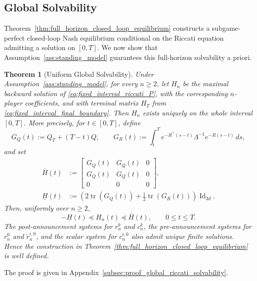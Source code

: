 \documentclass[12pt]{article}
\numberwithin{equation}{section}
\newtheorem{theorem}{Theorem}[section]
\theoremstyle{definition}
\begin{document}
\subsection{Global Solvability}\label{sec:solvability_structure}

Theorem~\ref{thm:full_horizon_closed_loop_equilibrium} constructs a
subgame-perfect closed-loop Nash equilibrium conditional on the Riccati
equation admitting a solution on \([0,T]\). We now show that
Assumption~\ref{ass:standing_model} guarantees this full-horizon solvability a
priori.

\begin{theorem}[Uniform Global Solvability]
\label{thm:global_riccati_solvability}
Under Assumption~\ref{ass:standing_model}, for every \(n\ge2\), let
\(H_n\) be the maximal backward solution of
\eqref{eq:fixed_interval_riccati_P}, with the corresponding
\(n\)-player coefficients, and with terminal matrix \(H_T\) from
\eqref{eq:fixed_interval_final_boundary}.
Then \(H_n\) exists uniquely on the whole interval \([0,T]\).
More precisely, for \(t\in[0,T]\), define
\[
G_Q(t):=Q_T+(T-t)Q,
\qquad
G_R(t)
:=
\int_t^T
e^{-R^\top(s-t)}\Lambda^{-1}e^{-R(s-t)}\,ds,
\]
and set
\begin{align}
\overline H(t)
&:=
\begin{bmatrix}
G_Q(t)&G_Q(t)&0\\
G_Q(t)&G_Q(t)&0\\
0&0&0
\end{bmatrix},
\label{eq:global_riccati_upper_bound_matrix}\\
\underline H(t)
&:=
\left(
2\operatorname{tr}(G_Q(t))
+\frac12\operatorname{tr}(G_R(t))
\right)\operatorname{Id}_{3d}.
\label{eq:global_riccati_lower_bound_matrix}
\end{align}
Then, uniformly over \(n\ge2\),
\begin{equation}
\label{eq:global_riccati_two_sided_bound}
-\underline H(t)
\preceq
H_n(t)
\preceq
\overline H(t),
\qquad
0\le t\le T.
\end{equation}
The post-announcement systems for \(r_n^k\) and \(c_n^k\), the
pre-announcement systems for \(r_n^0\) and
\(\widetilde r_n^{i,0}\), and the scalar system for \(c_n^{i,0}\) also admit
unique finite solutions. Hence the construction in
Theorem~\ref{thm:full_horizon_closed_loop_equilibrium} is well defined.
\end{theorem}

The proof is given in
Appendix~\ref{subsec:proof_global_riccati_solvability}.
\end{document}
